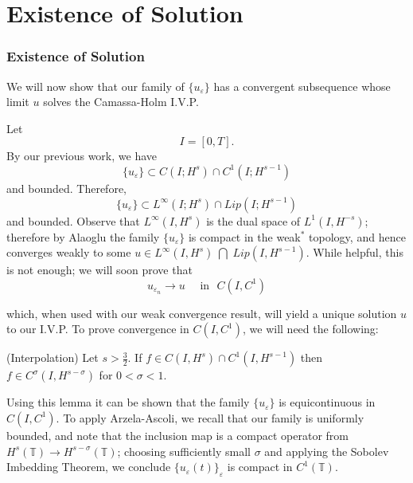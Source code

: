 \documentclass{beamer}
\newcommand{\ci}{\mathbb{T}}
\newcommand{\ee}{\varepsilon}
\begin{document}
 \section{Existence of Solution}
 \begin{frame}

 \frametitle{Existence of Solution}
 \vskip0.1in
 We will now show that our family of $\{u_\ee\}$ has a convergent subsequence
 whose limit $u$ solves the Camassa-Holm I.V.P. 

 Let
 $$
 I= [0, T].
 $$
By our previous work, we have 
%
\begin{equation*}
\label{C-1-fam}
\{u_\ee\}\subset C(I; H^{s})\cap C^1(I; H^{s-1})
\end{equation*}
%
and bounded. Therefore,  
 \begin{equation*}
\label{Lip-1-fam}
\{u_\ee\}\subset L^{\infty}(I; H^{s})\cap Lip(I; H^{s-1})
\end{equation*}
%
and bounded. Observe that  $L^\infty (I, H^s) $
is the dual space of $L^1(I, H^{-s})$; therefore by Alaoglu 
the family $\{u_\ee\}$ is compact in the weak$^*$ topology, and hence
converges weakly to some $u \in L^{\infty}(I, H^s) \; \bigcap\; Lip(I,
H^{s-1})$.  While helpful, this is not enough; we will soon prove that
\begin{equation*}
\label{strong-conv}
u_{\ee_n}\longrightarrow u
\quad
\text{ in } \,\,   C(I, C^1)
\end{equation*}
\end{frame}
\begin{frame}
which, when used with our weak convergence result, will yield a unique solution
$u$ to our I.V.P. To prove convergence in $C(I,C^1)$, we will need the
following:
%
%
%
%

\begin{lemma}
	\vskip0.1in
(Interpolation)  Let  $s > \frac{3}{2}$.
If $f \in C(I, H^s) \cap C^1(I, H^{s-1})$
then $f \in C^\sigma (I, H^{s- \sigma})$ for  $0 < \sigma < 1$.
\end{lemma}
%
%
\vskip0.1in
Using this lemma it can be shown that the family $\{u_\ee\}$ is equicontinuous
in $C(I,C^1)$. To apply Arzela-Ascoli, we recall that our family is uniformly
bounded, and note that the inclusion map is a
compact operator from $H^s(\ci) \to H^{s-\sigma}(\ci)$; choosing sufficiently
small $\sigma$ and applying the Sobolev Imbedding Theorem, we conclude
$\{u_\ee(t)\}_\ee$ is compact in $C^1(\ci)$. 
\end{frame}
\end{document}
